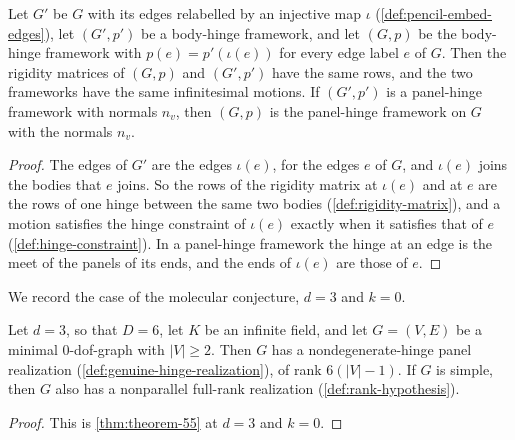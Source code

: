 \begin{lemma}
  \label{lem:embed-edges-framework}
  \leanok
  Let $G'$ be $G$ with its edges relabelled by an injective map $\iota$
  (\cref{def:pencil-embed-edges}), let $(G', p')$ be a body-hinge
  framework, and let $(G, p)$ be the body-hinge framework with
  $p(e) = p'(\iota(e))$ for every edge label $e$ of $G$. Then the rigidity
  matrices of $(G, p)$ and $(G', p')$ have the same rows, and the two
  frameworks have the same infinitesimal motions. If $(G', p')$ is a
  panel-hinge framework with normals $n_v$, then $(G, p)$ is the
  panel-hinge framework on $G$ with the normals $n_v$.
\end{lemma}
\begin{proof}
  \leanok
  The edges of $G'$ are the edges $\iota(e)$, for the edges $e$ of $G$,
  and $\iota(e)$ joins the bodies that $e$ joins. So the rows of the
  rigidity matrix at $\iota(e)$ and at $e$ are the rows of one hinge
  between the same two bodies (\cref{def:rigidity-matrix}), and a motion
  satisfies the hinge constraint of $\iota(e)$ exactly when it satisfies
  that of $e$ (\cref{def:hinge-constraint}). In a panel-hinge framework
  the hinge at an edge is the meet of the panels of its ends, and the
  ends of $\iota(e)$ are those of $e$.
\end{proof}

We record the case of the molecular conjecture, $d = 3$ and $k = 0$.

\begin{theorem}[KT Theorem 5.5 at $d = 3$ and deficiency zero]
  \label{thm:theorem-55-d3-instance}
  \leanok
  Let $d = 3$, so that $D = 6$, let $K$ be an infinite field, and let
  $G = (V, E)$ be a minimal $0$-dof-graph with $|V| \ge 2$. Then $G$ has
  a nondegenerate-hinge panel realization
  (\cref{def:genuine-hinge-realization}), of rank $6(|V| - 1)$. If $G$ is
  simple, then $G$ also has a nonparallel full-rank realization
  (\cref{def:rank-hypothesis}).
\end{theorem}
\begin{proof}
  \leanok
  This is \cref{thm:theorem-55} at $d = 3$ and $k = 0$.
\end{proof}

